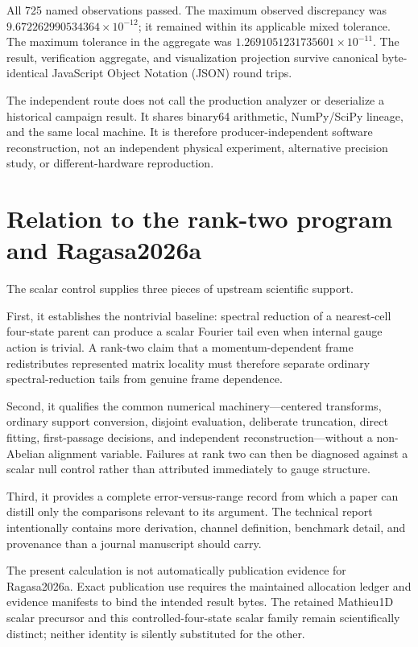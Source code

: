 \documentclass[11pt]{article}
\begin{document}
All 725 named observations passed.  The maximum observed discrepancy was
$9.672262990534364\times10^{-12}$; it remained within its applicable mixed tolerance.
The maximum tolerance in the aggregate was
$1.2691051231735601\times10^{-11}$.  The result, verification aggregate, and
visualization projection survive canonical byte-identical JavaScript Object Notation
(JSON) round trips.

The independent route does not call the production analyzer or deserialize a historical
campaign result.  It shares binary64 arithmetic, NumPy/SciPy lineage, and the same local
machine.  It is therefore producer-independent software reconstruction, not an
independent physical experiment, alternative precision study, or different-hardware
reproduction.

\section{Relation to the rank-two program and Ragasa2026a}

The scalar control supplies three pieces of upstream scientific support.

First, it establishes the nontrivial baseline: spectral reduction of a nearest-cell
four-state parent can produce a scalar Fourier tail even when internal gauge action is
trivial.  A rank-two claim that a momentum-dependent frame redistributes represented
matrix locality must therefore separate ordinary spectral-reduction tails from genuine
frame dependence.

Second, it qualifies the common numerical machinery---centered transforms, ordinary
support conversion, disjoint evaluation, deliberate truncation, direct fitting,
first-passage decisions, and independent reconstruction---without a non-Abelian
alignment variable.  Failures at rank two can then be diagnosed against a scalar null
control rather than attributed immediately to gauge structure.

Third, it provides a complete error-versus-range record from which a paper can distill
only the comparisons relevant to its argument.  The technical report intentionally
contains more derivation, channel definition, benchmark detail, and provenance than a
journal manuscript should carry.

The present calculation is not automatically publication evidence for Ragasa2026a.
Exact publication use requires the maintained allocation ledger and evidence manifests
to bind the intended result bytes.  The retained Mathieu1D scalar precursor and this
controlled-four-state scalar family remain scientifically distinct; neither identity is
silently substituted for the other.
\end{document}
